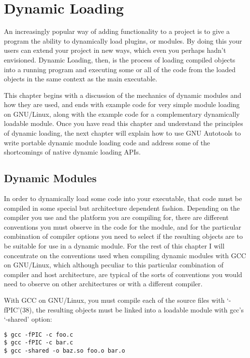 \chapter{Dynamic Loading}

An increasingly popular way of adding functionality to a project is to give a program the ability to dynamically load plugins, or modules. By doing this your users can extend your project in new ways, which even you perhaps hadn't envisioned. Dynamic Loading, then, is the process of loading compiled objects into a running program and executing some or all of the code from the loaded objects in the same context as the main executable.

This chapter begins with a discussion of the mechanics of dynamic modules and how they are used, and ends with example code for very simple module loading on GNU/Linux, along with the example code for a complementary dynamically loadable module. Once you have read this chapter and understand the principles of dynamic loading, the next chapter will explain how to use GNU Autotools to write portable dynamic module loading code and address some of the shortcomings of native dynamic loading APIs. 

\section{Dynamic Modules}

In order to dynamically load some code into your executable, that code must be compiled in some special but architecture dependent fashion. Depending on the compiler you use and the platform you are compiling for, there are different conventions you must observe in the code for the module, and for the particular combination of compiler options you need to select if the resulting objects are to be suitable for use in a dynamic module. For the rest of this chapter I will concentrate on the conventions used when compiling dynamic modules with GCC on GNU/Linux, which although peculiar to this particular combination of compiler and host architecture, are typical of the sorts of conventions you would need to observe on other architectures or with a different compiler.

With GCC on GNU/Linux, you must compile each of the source files with `-fPIC'(38), the resulting objects must be linked into a loadable module with gcc's `-shared' option: 

\begin{Verbatim}[frame=single]
$ gcc -fPIC -c foo.c
$ gcc -fPIC -c bar.c
$ gcc -shared -o baz.so foo.o bar.o
\end{Verbatim}

